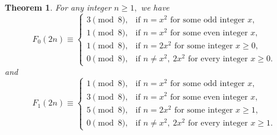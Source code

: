 \documentclass[12pt]{article}
\numberwithin{equation}{section}
\newtheorem{theorem}{Theorem}[section]
\theoremstyle{definition}
\theoremstyle{remark}
\numberwithin{equation}{section}
\begin{document}
\begin{theorem}
For any integer $n\geq1,$ we have 
\begin{equation}\label{e3}
F_0(2n)\equiv
\begin{cases}
3 \pmod 8, & \text{if } n=x^2 \text{ for some odd integer }x,\\[4pt]
1 \pmod 8, & \text{if } n=x^2 \text{ for some even integer }x,\\[4pt]
1 \pmod 8, & \text{if } n=2x^2 \text{ for some integer }x\geq0,\\[4pt]
0 \pmod 8, & \text{if } n\neq x^2,\ 2x^2
\text{ for every integer }x\geq0.
\end{cases}
\end{equation}
and 
\begin{equation}\label{A53}
F_1(2n)\equiv
\begin{cases}
1 \pmod 8, & \text{if } n=x^2 \text{ for some odd integer } x,\\
3 \pmod 8, & \text{if } n=x^2 \text{ for some even integer } x,\\
5 \pmod 8, & \text{if } n=2x^2 \text{ for some integer } x\geq1,\\
0 \pmod 8, & \text{if } n\neq x^2,\ 2x^2 \text{ for every integer } x\geq1.
\end{cases}
\end{equation}
\end{theorem}
\end{document}
